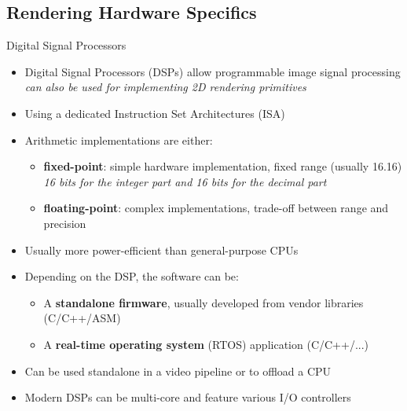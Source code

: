 \subsection{Rendering Hardware Specifics}

\begin{frame}{Digital Signal Processors}
  \begin{itemize}
  \item Digital Signal Processors (DSPs) allow programmable image signal processing\\
    \textit{can also be used for implementing 2D rendering primitives}
  \item Using a dedicated Instruction Set Architectures (ISA)
  \item Arithmetic implementations are either:
    \begin{itemize}
    \item \textbf{fixed-point}: simple hardware implementation, fixed range (usually 16.16)\\
      \textit{16 bits for the integer part and 16 bits for the decimal part}
    \item \textbf{floating-point}: complex implementations, trade-off between range and precision
    \end{itemize}
  \item Usually more power-efficient than general-purpose CPUs
  \item Depending on the DSP, the software can be:
    \begin{itemize}
    \item A \textbf{standalone firmware}, usually developed from vendor libraries (C/C++/ASM)
    \item A \textbf{real-time operating system} (RTOS) application (C/C++/...)
    \end{itemize}
  \item Can be used standalone in a video pipeline or to offload a CPU
  \item Modern DSPs can be multi-core and feature various I/O controllers
  \end{itemize}
\end{frame}

